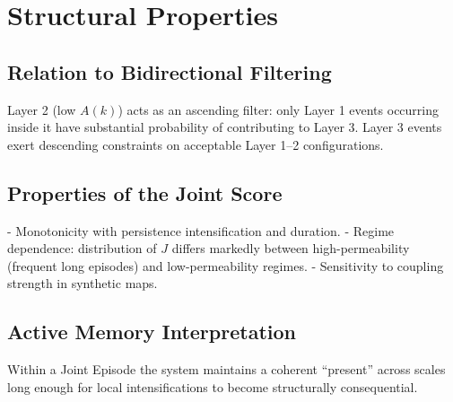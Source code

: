 \section{Structural Properties}

\subsection{Relation to Bidirectional Filtering}

Layer 2 (low $A(k)$) acts as an ascending filter: only Layer 1 events occurring inside it have substantial probability of contributing to Layer 3. Layer 3 events exert descending constraints on acceptable Layer 1–2 configurations.

\subsection{Properties of the Joint Score}

- Monotonicity with persistence intensification and duration.
- Regime dependence: distribution of $J$ differs markedly between high-permeability (frequent long episodes) and low-permeability regimes.
- Sensitivity to coupling strength in synthetic maps.

\subsection{Active Memory Interpretation}

Within a Joint Episode the system maintains a coherent “present” across scales long enough for local intensifications to become structurally consequential.
